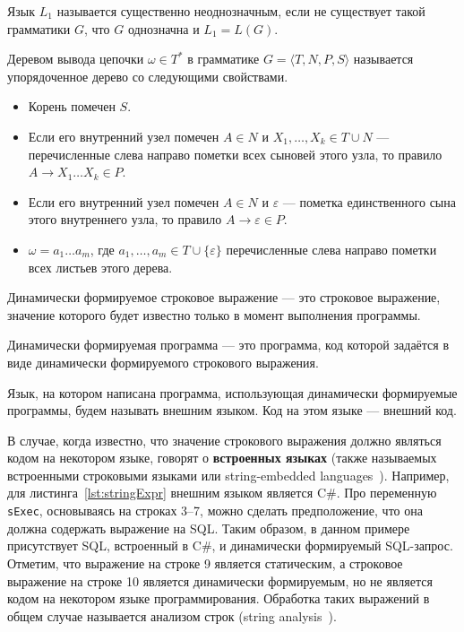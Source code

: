 \begin{mydef}    
    Язык $L_1$ называется существенно неоднозначным, если не существует такой грамматики $G$, что $G$ однозначна и $L_1 = L(G)$. 
\end{mydef}

\begin{mydef}
    Деревом вывода цепочки $\omega \in T^*$ в грамматике $G=\langle T, N, P, S \rangle$ называется упорядоченное дерево со следующими свойствами. 
\begin{itemize}
    \item Корень помечен $S$.

    \item Если его внутренний узел помечен $A \in N$ и $X_1, \ldots , X_k \in T \cup N$ ---   перечисленные слева направо пометки всех сыновей этого узла, то правило $A \rightarrow X_1 \ldots X_k \in P$.

    \item Если его внутренний узел помечен $A \in N$ и $\varepsilon$ --- пометка единственного сына этого внутреннего узла, то правило $A \rightarrow \varepsilon \in P$.

    \item $\omega = a_1 \ldots a_m$, где $a_1, \ldots , a_m \in T \cup \{\varepsilon\} $ перечисленные слева направо пометки всех листьев этого дерева.
    
\end{itemize}
\end{mydef}

\begin{mydef}    
    Динамически формируемое строковое выражение --- это строковое выражение, значение которого будет известно только в момент выполнения программы.
\end{mydef}

\begin{mydef}    
    Динамически формируемая программа --- это программа, код которой задаётся в виде динамически формируемого строкового выражения.
\end{mydef}


\begin{mydef}    
     Язык, на котором написана программа, использующая динамически формируемые программы, будем называть внешним языком. Код на этом языке --- внешний код.
\end{mydef}     
      В случае, когда известно, что значение строкового выражения должно являться кодом на некотором языке, говорят о \textbf{встроенных языках} (также называемых встроенными строковыми языками или string-embedded languages~\cite{Alvor1}). Например, для листинга~\ref{lst:stringExpr} внешним языком является C\#. Про переменную \verb|sExec|, основываясь на строках 3--7, можно сделать предположение, что она должна содержать выражение на SQL. Таким образом, в данном примере присутствует SQL, встроенный в C\#, и динамически формируемый SQL-запрос. Отметим, что выражение на строке 9 является статическим, а строковое выражение на строке 10 является динамически формируемым, но не является кодом на некотором языке программирования. Обработка таких выражений в общем случае называется анализом строк (string analysis~\cite{StringAnalysis}).


